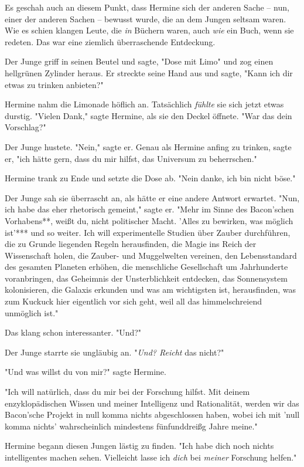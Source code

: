 {Es geschah auch an diesem Punkt, dass Hermine sich der anderen Sache -- nun, einer der anderen Sachen -- bewusst wurde, die an dem Jungen seltsam waren. Wie es schien klangen Leute, die \emph{in} Büchern waren, auch \emph{wie} ein Buch, wenn sie redeten. Das war eine ziemlich überraschende Entdeckung.

Der Junge griff in seinen Beutel und sagte, "Dose mit Limo" und zog einen hellgrünen Zylinder heraus. Er streckte seine Hand aus und sagte, "Kann ich dir etwas zu trinken anbieten?"

Hermine nahm die Limonade höflich an. Tatsächlich \emph{fühlte} sie sich jetzt etwas durstig. "Vielen Dank," sagte Hermine, als sie den Deckel öffnete. "War das dein Vorschlag?"

Der Junge hustete. "Nein," sagte er. Genau als Hermine anfing zu trinken, sagte er, "ich hätte gern, dass du mir hilfst, das Universum zu beherrschen."

Hermine trank zu Ende und setzte die Dose ab. "Nein danke, ich bin nicht böse."

Der Junge sah sie überrascht an, als hätte er eine andere Antwort erwartet. "Nun, ich habe das eher rhetorisch gemeint," sagte er. "Mehr im Sinne des Bacon'schen Vorhabens**, weißt du, nicht politischer Macht. 'Alles zu bewirken, was möglich ist'*** und so weiter. Ich will experimentelle Studien über Zauber durchführen, die zu Grunde liegenden Regeln herausfinden, die Magie ins Reich der Wissenschaft holen, die Zauber- und Muggelwelten vereinen, den Lebensstandard des gesamten Planeten erhöhen, die menschliche Gesellschaft um Jahrhunderte voranbringen, das Geheimnis der Unsterblichkeit entdecken, das Sonnensystem kolonisieren, die Galaxis erkunden und was am wichtigsten ist, herausfinden, was zum Kuckuck hier eigentlich vor sich geht, weil all das himmelschreiend unmöglich ist."

Das klang schon interessanter. "Und?"

Der Junge starrte sie ungläubig an. "\emph{Und? Reicht} das nicht?"

"Und was willst du von mir?" sagte Hermine.

"Ich will natürlich, dass du mir bei der Forschung hilfst. Mit deinem enzyklopädischen Wissen und meiner Intelligenz und Rationalität, werden wir das Bacon'sche Projekt in null komma nichts abgeschlossen haben, wobei ich mit 'null komma nichts' wahrscheinlich mindestens fünfunddreißg Jahre meine."

Hermine begann diesen Jungen lästig zu finden. "Ich habe dich noch nichts intelligentes machen sehen. Vielleicht lasse ich \emph{dich} bei \emph{meiner} Forschung helfen."

}
